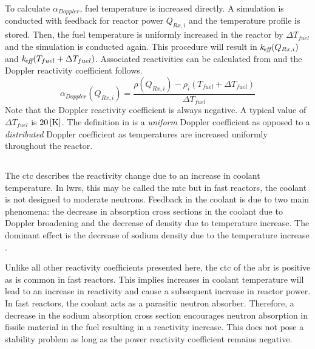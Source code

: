     To calculate $\alpha_{Doppler}$, fuel temperature is increased directly. A
    simulation is conducted with feedback for reactor power $Q_{Rx,i}$ and the
    temperature profile is stored. Then, the fuel temperature is uniformly 
    increased in the reactor by $\Delta T_{fuel}$ and the simulation is
    conducted again. This procedure will result in $k_{\!\mbox{\scriptsize \em eff}}(Q_{Rx,i})$ and
    ${k_{\!\mbox{\scriptsize \em eff}}(T_{fuel} + \Delta T_{fuel})}$. Associated reactivities can be
    calculated from  and the Doppler reactivity coefficient
    follows.
    \begin{equation}
      \label{eq:doppler_reactivity_coefficient}
      \alpha_{Doppler}(Q_{Rx,i}) = \frac{\rho(Q_{Rx,i}) - \rho_i(T_{fuel} +
        \Delta T_{fuel})} {\Delta T_{fuel}}
    \end{equation}
    Note that the Doppler reactivity coefficient is always negative.
    A typical value of $\Delta T_{fuel}$ is $20\left[\text{{K}}\right]$.
    The definition in  is a
    \textit{uniform} Doppler coefficient as opposed to a \textit{distributed} 
    Doppler coefficient as temperatures are increased uniformly throughout the
    reactor.

  \subsection{\texorpdfstring{}{Coolant Temperature
    Coefficient (CTC)}}
  \label{sec:coolant_temperature_reactivity_coefficient}
    The \gls{ctc} describes the
    reactivity change due to an increase in coolant temperature. In \glspl{lwr}, 
    this may be called the \gls{mtc} but in fast
    reactors, the coolant is not designed to moderate neutrons. Feedback in the 
    coolant is due to two main phenomena: the decrease in absorption 
    cross sections in the coolant due to Doppler broadening and the decrease of 
    density due to temperature increase. The dominant effect is the decrease of 
    sodium density due to the temperature increase \cite{textbookknief}.

    Unlike all other reactivity coefficients presented here, the \gls{ctc} of the 
    \gls{abr} is positive as is common in fast reactors. This implies increases 
    in coolant temperature will lead to an increase in reactivity and cause a 
    subsequent increase in reactor power. In fast reactors, the coolant acts as 
    a parasitic neutron absorber. Therefore, a decrease in the sodium absorption 
    cross section encourages neutron absorption in fissile material in the fuel 
    resulting in a reactivity increase. This does not pose a stability problem 
    as long as the power reactivity coefficient remains negative.

